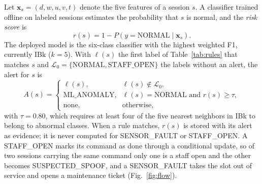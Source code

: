 \documentclass[sigconf,screen]{acmart}
\begin{document}
Let $\mathbf{x}_s = (d, w, u, v, t)$ denote the five features of a session $s$. A classifier trained offline on labeled
sessions estimates the probability that $s$ is normal, and the \emph{risk score} is
\begin{equation}
r(s) = 1 - P\left(y = \text{NORMAL} \mid \mathbf{x}_s\right).
\label{eq:risk}
\end{equation}
The deployed model is the six-class classifier with the highest weighted F1, currently IBk ($k=5$). With $\ell(s)$ the
first label of Table~\ref{tab:rules} that matches $s$ and $\mathcal{L}_0 = \{\text{NORMAL}, \text{STAFF\_OPEN}\}$ the
labels without an alert, the alert for $s$ is
\begin{equation}
A(s) =
\begin{cases}
\ell(s), & \ell(s) \notin \mathcal{L}_0,\\
\text{ML\_ANOMALY}, & \ell(s) = \text{NORMAL} \text{ and } r(s) \geq \tau,\\
\text{none}, & \text{otherwise},
\end{cases}
\label{eq:alert}
\end{equation}
with $\tau = 0.80$, which requires at least four of the five nearest neighbors in IBk to belong to abnormal classes.
When a rule matches, $r(s)$ is stored with its alert as evidence; it is never computed for SENSOR\_FAULT or
STAFF\_OPEN. A STAFF\_OPEN marks its command as done through a conditional update, so of two sessions carrying the same
command only one is a staff open and the other becomes SUSPECTED\_SPOOF, and a SENSOR\_FAULT takes the slot out of
service and opens a maintenance ticket (Fig.~\ref{fig:flow}).
\end{document}
